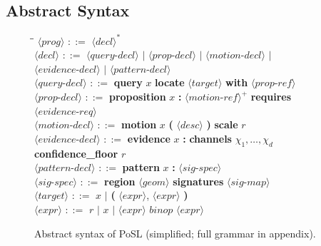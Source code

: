 \documentclass[twocolumn,10pt]{article}
\begin{document}
\subsection{Abstract Syntax}

\begin{figure}[ht]
\small
\begin{tabbing}
\hspace{1em}\=\hspace{0.5em}\=\kill
$\langle\mathit{prog}\rangle$  \> $::=$ \> $\langle\mathit{decl}\rangle^*$ \\[2pt]
$\langle\mathit{decl}\rangle$  \> $::=$ \>
  $\langle\mathit{query\text{-}decl}\rangle$
  $\mid$ $\langle\mathit{prop\text{-}decl}\rangle$
  $\mid$ $\langle\mathit{motion\text{-}decl}\rangle$
  $\mid$ $\langle\mathit{evidence\text{-}decl}\rangle$
  $\mid$ $\langle\mathit{pattern\text{-}decl}\rangle$ \\[2pt]
$\langle\mathit{query\text{-}decl}\rangle$ \> $::=$ \>
  \textbf{query} $x$ \textbf{locate} $\langle\mathit{target}\rangle$
  \textbf{with} $\langle\mathit{prop\text{-}ref}\rangle$ \\[2pt]
$\langle\mathit{prop\text{-}decl}\rangle$ \> $::=$ \>
  \textbf{proposition} $x$ \textbf{:}
  $\langle\mathit{motion\text{-}ref}\rangle^+$
  \textbf{requires} $\langle\mathit{evidence\text{-}req}\rangle$ \\[2pt]
$\langle\mathit{motion\text{-}decl}\rangle$ \> $::=$ \>
  \textbf{motion} $x$ \textbf{(} $\langle\mathit{desc}\rangle$ \textbf{)}
  \textbf{scale} $r$ \\[2pt]
$\langle\mathit{evidence\text{-}decl}\rangle$ \> $::=$ \>
  \textbf{evidence} $x$ \textbf{:}
  \textbf{channels} $\chi_1, \ldots, \chi_d$
  \textbf{confidence\_floor} $r$ \\[2pt]
$\langle\mathit{pattern\text{-}decl}\rangle$ \> $::=$ \>
  \textbf{pattern} $x$ \textbf{:} $\langle\mathit{sig\text{-}spec}\rangle$ \\[2pt]
$\langle\mathit{sig\text{-}spec}\rangle$ \> $::=$ \>
  \textbf{region} $\langle\mathit{geom}\rangle$
  \textbf{signatures} $\langle\mathit{sig\text{-}map}\rangle$ \\[2pt]
$\langle\mathit{target}\rangle$ \> $::=$ \>
  $x$ $\mid$ \textbf{(} $\langle\mathit{expr}\rangle$,
  $\langle\mathit{expr}\rangle$ \textbf{)} \\[2pt]
$\langle\mathit{expr}\rangle$ \> $::=$ \>
  $r$ $\mid$ $x$ $\mid$ $\langle\mathit{expr}\rangle$ $\mathit{binop}$
  $\langle\mathit{expr}\rangle$
\end{tabbing}
\caption{Abstract syntax of PoSL (simplified; full grammar in appendix).}
\label{fig:bnf}
\end{figure}
\end{document}
